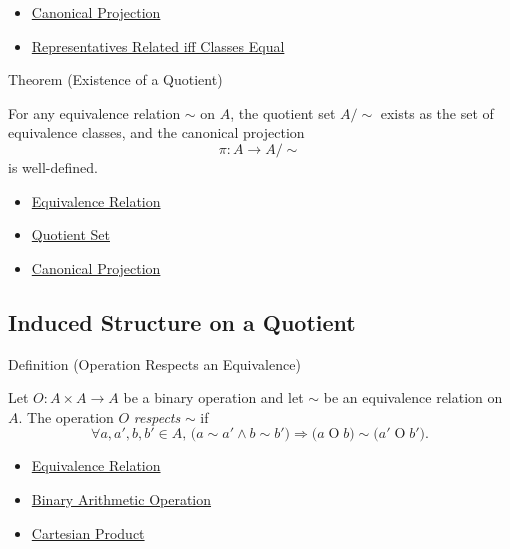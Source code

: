 \begin{dependencies}
\begin{itemize}
  \item \hyperref[def:canonical-projection]{Canonical Projection}
  \item \hyperref[prop:representatives-related-iff-classes-equal]{Representatives Related iff Classes Equal}
\end{itemize}
\end{dependencies}

\begin{theorembox}{Theorem (Existence of a Quotient)}
\begin{theorem}
\label{thm:existence-of-a-quotient}
For any equivalence relation $\sim$ on $A$, the quotient set $A/{\sim}$ exists
as the set of equivalence classes, and the canonical projection
\[
\pi:A\to A/{\sim}
\]
is well-defined.
\end{theorem}
\end{theorembox}

\begin{dependencies}
\begin{itemize}
  \item \hyperref[def:equivalence-relation]{Equivalence Relation}
  \item \hyperref[def:quotient-set]{Quotient Set}
  \item \hyperref[def:canonical-projection]{Canonical Projection}
\end{itemize}
\end{dependencies}

\subsection*{Induced Structure on a Quotient}

\begin{definitionbox}{Definition (Operation Respects an Equivalence)}
\begin{definition}
\label{def:operation-respects-equivalence}
Let $O:A\times A\to A$ be a binary operation and let $\sim$ be an equivalence
relation on $A$. The operation $O$ \emph{respects} $\sim$ if
\[
\forall a,a',b,b'\in A,\,
\bigl(a\sim a'\land b\sim b'\bigr)
\Longrightarrow
\bigl(a\mathbin{O}b\bigr)\sim\bigl(a'\mathbin{O}b'\bigr).
\]
\end{definition}
\end{definitionbox}

\begin{dependencies}
\begin{itemize}
  \item \hyperref[def:equivalence-relation]{Equivalence Relation}
  \item \hyperref[def:binary-arithmetic-operation]{Binary Arithmetic Operation}
  \item \hyperref[def:cartesian-product-rel]{Cartesian Product}
\end{itemize}
\end{dependencies}

